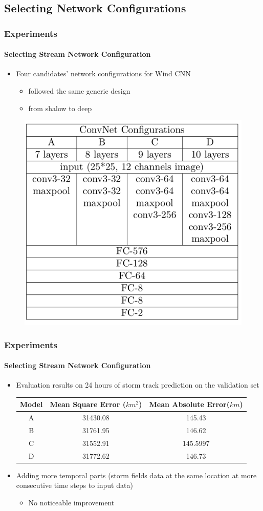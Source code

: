 \documentclass{beamer}
\begin{document}
\subsection{Selecting Network Configurations}
\begin{frame}
\frametitle{Experiments}
\framesubtitle{Selecting Stream Network Configuration}
\begin{itemize}
	\item  Four candidates' network configurations for Wind CNN\\
	\begin{itemize}
		\item followed the same generic design
		\item from shalow to deep
	\end{itemize}
\end{itemize}
\begin{figure}
	\includegraphics[width=0.4\linewidth, height=0.5\textheight]{figs/candidates.png} \\
\end{figure}
\end{frame}

\begin{frame}
\frametitle{Experiments}
\framesubtitle{Selecting Stream Network Configuration}
\begin{itemize}
	\item  Evaluation results on 24 hours of storm track prediction on the validation set\\

\begin{table}[]
	\centering
	\begin{tabular}{|c|c|c|}
		\hline
		Model& Mean Square Error ($km^2$) & Mean Absolute Error($km$) \\ \hline
		A & 31430.08 & 145.43  \\ \hline
		B & 31761.95 & 146.62  \\ \hline
		C & 31552.91 & 145.5997 \\ \hline
		D & 31772.62 & 146.73 \\ \hline
	\end{tabular}
\end{table}
	\item Adding more temporal parts (storm fields data at the same location at more consecutive time steps to input data)
	\begin{itemize}
		\item  No noticeable improvement\\
	\end{itemize}
\end{itemize}
\end{frame}
\end{document}
